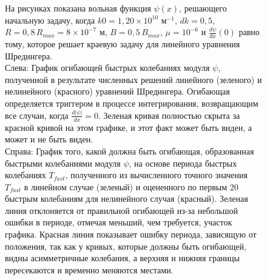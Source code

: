 \documentclass[A4,12pt,oneside]{article}
\renewcommand{\(}{\left(}
\renewcommand{\)}{\right)}
\begin{document}
\begin{center}
\begin{figure}
\caption{\label{fig:errAbs}
На рисунках показана вольная функция $\psi\left(x\right)$, решающего начальную задачу, когда $k0 = 1,20 \times 10^{10}$ м$^{-1}$, $dk = 0,5$, $R = 0,8\, R_{max} = 8 \times 10^{-7}$ м, $B = 0,5\, B_{max}$, $\mu = 10^{-6}$ и $\frac{d\psi}{dx}\left(0\right)$ равно тому, которое решает краевую задачу для линейного уравнения Шредингера.\\
Слева: График огибающей быстрых колебаниях модуля $\psi$, полученной в результате численных решений линейного (зеленого) и нелинейного (красного) уравнений Шредингера. Огибающая определяется триггером в процессе интегрирования, возвращающим все случаи, когда $\frac{d|\psi|}{dx} = 0$. Зеленая кривая полностью скрыта за красной кривой на этом графике, и этот факт может быть виден, а может и не быть виден. \\
Справа: График того, какой должна быть огибающая, образованная быстрыми колебаниями модуля $\psi$, на основе периода быстрых колебаниях $T_{fast}$, полученного из вычисленного точного значения $T_{fast}$ в линейном случае (зеленый) и оцененного по первым 20 быстрым колебаниям для нелинейного случая (красный). Зеленая линия отклоняется от правильной огибающей из-за небольшой ошибки в периоде, отмечая меньший, чем требуется, участок графика. Красная линия показывает ошибку периода, зависящую от положения, так как у кривых, которые должны быть огибающей, видны асимметричные колебания, а верхняя и нижняя границы пересекаются и временно меняются местами.
}
\end{figure}
\end{center}
\end{document}
